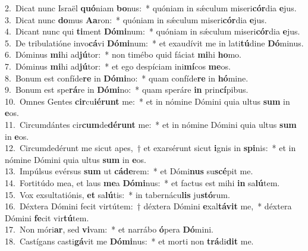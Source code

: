 {2.~}Dicat nunc Israël \textbf{quó}niam \textbf{bo}nus:~* quóniam in sǽculum miseri\textbf{cór}dia \textbf{e}jus.\\
{3.~}Dicat nunc \textbf{do}mus \textbf{A}\textbf{a}ron:~* quóniam in sǽculum miseri\textbf{cór}dia \textbf{e}jus.\\
{4.~}Dicant nunc qui \textbf{ti}ment \textbf{Dó}\textbf{mi}num:~* quóniam in sǽculum miseri\textbf{cór}dia \textbf{e}jus.\\
{5.~}De tribulatióne invo\textbf{cá}vi \textbf{Dó}\textbf{mi}num:~* et exaudívit me in lati\textbf{tú}dine \textbf{Dó}minus.\\
{6.~}Dóminus \textbf{mi}hi ad\textbf{jú}tor:~* non timébo quid fáciat \textbf{mi}hi \textbf{ho}mo.\\
{7.~}Dóminus \textbf{mi}hi ad\textbf{jú}tor:~* et ego despíciam ini\textbf{mí}cos \textbf{me}os.\\
{8.~}Bonum est confíde\textbf{re} in \textbf{Dó}\textbf{mi}no:~* quam confíde\textbf{re} in \textbf{hó}mine.\\
{9.~}Bonum est spe\textbf{rá}re in \textbf{Dó}\textbf{mi}no:~* quam speráre \textbf{in} prin\textbf{cí}pibus.\\
{10.~}Omnes Gentes \textbf{cir}cu\textbf{ié}\textbf{runt} me:~* et in nómine Dómini quia ultus \textbf{sum} in \textbf{e}os.\\
{11.~}Circumdántes cir\textbf{cum}de\textbf{dé}\textbf{runt} me:~* et in nómine Dómini quia ultus \textbf{sum} in \textbf{e}os.\\
{12.~}Circumdedérunt me sicut apes,~† et exarsérunt sicut \textbf{i}gnis in \textbf{spi}nis:~* et in nómine Dómini quia ultus \textbf{sum} in \textbf{e}os.\\
{13.~}Impúlsus evérsus \textbf{sum} ut \textbf{cá}\textbf{de}rem:~* et Dómi\textbf{nus} su\textbf{scé}pit me.\\
{14.~}Fortitúdo mea, et laus \textbf{me}a \textbf{Dó}\textbf{mi}nus:~* et factus est mihi \textbf{in} sa\textbf{lú}tem.\\
{15.~}Vox exsultatiónis, \textbf{et} sa\textbf{lú}tis:~* in tabernácu\textbf{lis} ju\textbf{stó}rum.\\
{16.~}Déxtera Dómini fecit virtútem:~† déxtera Dómini \textbf{e}xal\textbf{tá}\textbf{vit} me,~* déxtera Dómini \textbf{fe}cit vir\textbf{tú}tem.\\
{17.~}Non móri\textbf{ar}, sed \textbf{vi}vam:~* et narrábo \textbf{ó}pera \textbf{Dó}mini.\\
{18.~}Castígans casti\textbf{gá}vit me \textbf{Dó}\textbf{mi}nus:~* et morti non \textbf{trá}di\textbf{dit} me.\\
